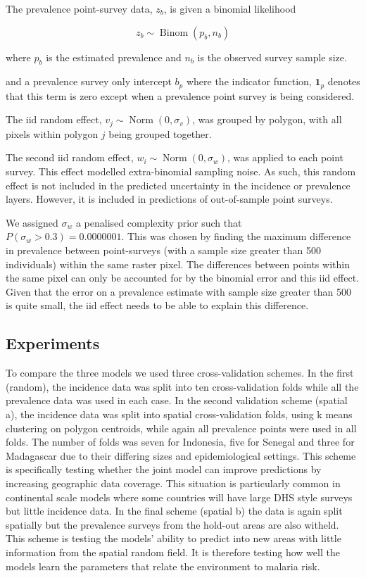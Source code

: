 \documentclass[10pt,letterpaper]{article}
\begin{document}
The prevalence point-survey data, $z_b$, is given a binomial likelihood

$$z_b \sim \operatorname{Binom}(p_b, n_b) $$

where $p_b$ is the estimated prevalence and $n_b$ is the observed survey sample size. 

and a prevalence survey only intercept $b_p$ where the indicator function, $\mathbf{1}_p$ denotes that this term is zero except when a prevalence point survey is being considered.

The iid random effect, $v_j \sim \operatorname{Norm}(0, \sigma_v)$,  was grouped by polygon, with all pixels within polygon $j$ being grouped together.

The second iid random effect, $w_i \sim \operatorname{Norm}(0, \sigma_w)$, was applied to each point survey.
This effect modelled extra-binomial sampling noise.
As such, this random effect is not included in the predicted uncertainty in the incidence or prevalence layers.
However, it is included in predictions of out-of-sample point surveys.


We assigned $\sigma_w$ a penalised complexity prior such that $P(\sigma_w > 0.3) = 0.0000001$. 
This was chosen by finding the maximum difference in prevalence between point-surveys (with a sample size greater than 500 individuals) within the same raster pixel.
The differences between points within the same pixel can only be accounted for by the binomial error and this iid effect.
Given that the error on a prevalence estimate with sample size greater than 500 is quite small, the iid effect needs to be able to explain this difference.





\subsection*{Experiments}

To compare the three models we used three cross-validation schemes. 
In the first (random), the incidence data was split into ten cross-validation folds while all the prevalence data was used in each case.
In the second validation scheme (spatial a), the incidence data was split into spatial cross-validation folds, using k means clustering on polygon centroids, while again all prevalence points were used in all folds.
The number of folds was seven for Indonesia, five for Senegal and three for Madagascar due to their differing sizes and epidemiological settings.
This scheme is specifically testing whether the joint model can improve predictions by increasing geographic data coverage.
This situation is particularly common in continental scale models where some countries will have large DHS style surveys but little incidence data.
In the final scheme (spatial b) the data is again split spatially but the prevalence surveys from the hold-out areas are also witheld.
This scheme is testing the models' ability to predict into new areas with little information from the spatial random field.
It is therefore testing how well the models learn the parameters that relate the environment to malaria risk.
\end{document}
